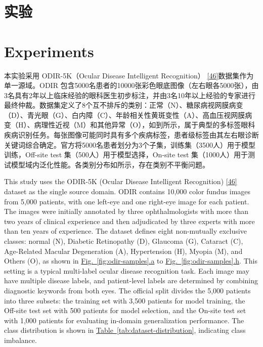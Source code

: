 \section{实验}\label{ux5b9eux9a8c}

\section*{Experiments}



本实验采用 ODIR-5K（Ocular Disease Intelligent Recognition） \hyperref[_Ref213949402]{{[}46{]}}数据集作为单一源域。ODIR 包含5000名患者的10000张彩色眼底图像（左右眼各5000张），由3名具有2年以上临床经验的眼科医生初步标注，并由3名10年以上经验的专家进行最终仲裁。数据集定义了8个互不排斥的类别：正常（N）、糖尿病视网膜病变（D）、青光眼（G）、白内障（C）、年龄相关性黄斑变性（A）、高血压视网膜病变（H）、病理性近视（M）和其他异常（O），如到所示，属于典型的多标签眼科疾病识别任务。每张图像可能同时具有多个疾病标签，患者级标签由其左右眼诊断关键词综合确定。官方将5000名患者划分为3个子集，训练集（3500人）用于模型训练，Off-site test 集（500人）用于模型选择，On-site test 集（1000人）用于测试模型域内泛化性能。各类别分布如所示，存在类别不平衡问题。

This study uses the ODIR-5K (Ocular Disease Intelligent Recognition) \hyperref[_Ref213949402]{{[}46{]}} dataset as the single source domain. ODIR contains 10,000 color fundus images from 5,000 patients, with one left-eye and one right-eye image for each patient. The images were initially annotated by three ophthalmologists with more than two years of clinical experience and then adjudicated by three experts with more than ten years of experience. The dataset defines eight non-mutually exclusive classes: normal (N), Diabetic Retinopathy (D), Glaucoma (G), Cataract (C), Age-Related Macular Degeneration (A), Hypertension (H), Myopia (M), and Others (O), as shown in \hyperref[fig:odir-samples]{Fig.~\ref*{fig:odir-samples}.a} to \hyperref[fig:odir-samples]{Fig.~\ref*{fig:odir-samples}.h}. This setting is a typical multi-label ocular disease recognition task. Each image may have multiple disease labels, and patient-level labels are determined by combining diagnostic keywords from both eyes. The official split divides the 5,000 patients into three subsets: the training set with 3,500 patients for model training, the Off-site test set with 500 patients for model selection, and the On-site test set with 1,000 patients for evaluating in-domain generalization performance. The class distribution is shown in \hyperref[tab:dataset-distribution]{Table~\ref*{tab:dataset-distribution}}, indicating class imbalance.

